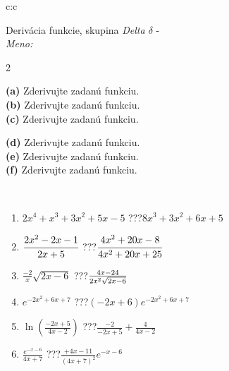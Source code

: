 \documentclass[10pt]{report}
\begin{document}
\newpage
\thispagestyle{empty}
\begin{tabular}{c:c}
\begin{minipage}[c][104.5mm][t]{0.5\linewidth}
\begin{center}
\vspace{7mm}
{\huge Derivácia funkcie, skupina \textit{Delta $\delta$} -}\\[5mm]
\textit{Meno:}\phantom{xxxxxxxxxxxxxxxxxxxxxxxxxxxxxxxxxxxxxxxxxxxxxxxxxxxxxxxxxxxxxxxxx}\\[5mm]
\begin{minipage}{0.95\linewidth}
\begin{center}
{\small \begin{multicols}{2} \raggedright
\textbf{(a)} Zderivujte zadanú funkciu. \\[1mm]
\textbf{(b)} Zderivujte zadanú funkciu. \\[1mm]
\textbf{(c)} Zderivujte zadanú funkciu. \par \columnbreak
\textbf{(d)} Zderivujte zadanú funkciu. \\[1mm]
\textbf{(e)} Zderivujte zadanú funkciu. \\[1mm]
\textbf{(f)} Zderivujte zadanú funkciu.
\end{multicols}
}
\end{center}
\end{minipage}
\\[4mm]
\begin{minipage}{0.79\linewidth}
\begin{center}
\begin{varwidth}{\linewidth}
\begin{enumerate}
\normalsize
\item $2x^4+x^3+3x^2+5x-5$\quad \dotfill\; ???\;\dotfill \quad $8x^3+3x^2+6x+5$
\item $\cfrac{2x^2-2x-1}{2x+5}$\quad \dotfill\; ???\;\dotfill \quad $\cfrac{4x^2+20x-8}{4x^2+20x+25}$
\item $\frac{-2}{x}\sqrt{2x-6}$\quad \dotfill\; ???\;\dotfill \quad $\frac{4x-24}{2x^2 \sqrt{\smash[b]{2x-6}}}$
\item $e^{-2x^2+6x+7}$\quad \dotfill\; ???\;\dotfill \quad $(-2x+6)e^{-2x^2+6x+7}$
\item $\ln{\left(\frac{-2x+5}{4x-2}\right)}$\quad \dotfill\; ???\;\dotfill \quad $\frac{-2}{-2x+5}+\frac{4}{4x-2}$
\item $\frac{e^{-x-6}}{4x+7}$\quad \dotfill\; ???\;\dotfill \quad $\frac{+4x-11}{(4x+7)^2}e^{-x-6}$
\end{enumerate}

\end{varwidth}
\end{center}
\end{minipage}
\end{center}
\end{minipage}
\end{tabular}
\end{document}
